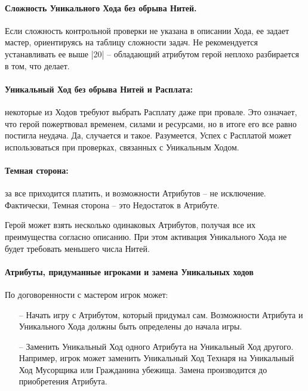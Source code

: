 \paragraph{Сложность Уникального Хода без обрыва Нитей.} Если сложность контрольной проверки не указана в описании Хода, ее задает мастер, ориентируясь на таблицу сложности задач. Не рекомендуется устанавливать ее выше |20| – обладающий атрибутом герой неплохо разбирается в том, что делает.
\paragraph{Уникальный Ход без обрыва Нитей и Расплата:} некоторые из Ходов требуют выбрать Расплату даже при провале. Это означает, что герой пожертвовал временем, силами и ресурсами, но в итоге его все равно постигла неудача. Да, случается и такое. Разумеется, Успех с Расплатой может использоваться при проверках, связанных с Уникальным Ходом.
\paragraph{Темная сторона:} за все приходится платить, и возможности Атрибутов – не исключение. Фактически, Темная сторона – это Недостаток в Атрибуте. 
\begin{tcolorbox}
Герой может взять несколько одинаковых Атрибутов, получая все их преимущества согласно описанию. При этом активация Уникального Хода не будет требовать меньшего числа Нитей.
\end{tcolorbox}
\paragraph{Атрибуты, придуманные игроками и замена Уникальных ходов}
По договоренности с мастером игрок может:
\begin{itemize}
    \item[--] Начать игру с Атрибутом, который придумал сам. Возможности Атрибута и Уникального Хода должны быть определены до начала игры.
    \item[--] Заменить Уникальный Ход одного Атрибута на Уникальный Ход другого. Например, игрок может заменить Уникальный Ход Технаря на Уникальный Ход Мусорщика или Гражданина убежища. Замена производится до приобретения Атрибута.
\end{itemize}


